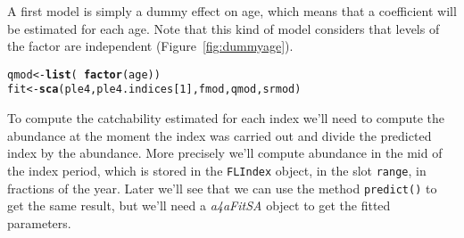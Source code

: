 \documentclass[a4paper,english,10pt]{article}\usepackage[]{graphicx}\usepackage[]{color}
\makeatletter
\newcommand{\hlnum}[1]{\textcolor[rgb]{0.686,0.059,0.569}{#1}}%
\newcommand{\hlopt}[1]{\textcolor[rgb]{0,0,0}{#1}}%
\newcommand{\hlstd}[1]{\textcolor[rgb]{0.345,0.345,0.345}{#1}}%
\newcommand{\hlkwb}[1]{\textcolor[rgb]{0.69,0.353,0.396}{#1}}%
\newcommand{\hlkwd}[1]{\textcolor[rgb]{0.737,0.353,0.396}{\textbf{#1}}}%
\newenvironment{kframe}{%
 \def\at@end@of@kframe{}%
 \ifinner\ifhmode%
  \def\at@end@of@kframe{\end{minipage}}%
  \begin{minipage}{\columnwidth}%
 \fi\fi%
 \def\FrameCommand##1{\hskip\@totalleftmargin \hskip-\fboxsep
 \colorbox{shadecolor}{##1}\hskip-\fboxsep
     \hskip-\linewidth \hskip-\@totalleftmargin \hskip\columnwidth}%
 \MakeFramed {\advance\hsize-\width
   \@totalleftmargin\z@ \linewidth\hsize
   \@setminipage}}%
 {\par\unskip\endMakeFramed%
 \at@end@of@kframe}
\newenvironment{knitrout}{}{} %
\newcommand{\code}[1]{{\texttt{#1}}}
\newcommand{\class}[1]{{\textit{#1}}}
\makeatother
\begin{document}
A first model is simply a dummy effect on age, which means that a coefficient will be estimated for each age. Note that this kind of model considers that levels of the factor are independent (Figure~\ref{fig:dummyage}).

\begin{knitrout}
\color{fgcolor}\begin{kframe}
\begin{alltt}
\hlstd{qmod} \hlkwb{<-} \hlkwd{list}\hlstd{(}\hlopt{~} \hlkwd{factor}\hlstd{(age))}
\hlstd{fit} \hlkwb{<-} \hlkwd{sca}\hlstd{(ple4, ple4.indices[}\hlnum{1}\hlstd{], fmod, qmod, srmod)}
\end{alltt}


{\ttfamily\noindent\bfseries{}}\end{kframe}
\end{knitrout}

To compute the catchability estimated for each index we'll need to compute the abundance at the moment the index was carried out and divide the predicted index by the abundance. More precisely we'll compute abundance in the mid of the index period, which is stored in the \code{FLIndex} object, in the slot \code{range}, in fractions of the year. Later we'll see that we can use the method \code{predict()} to get the same result, but we'll need a \class{a4aFitSA} object to get the fitted parameters.
\end{document}
